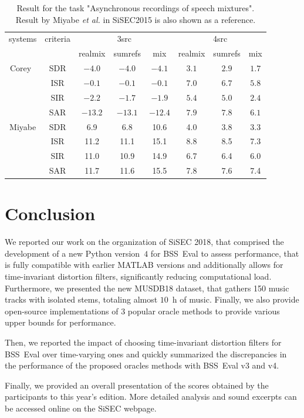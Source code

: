 \documentclass{llncs}
\begin{document}
\begin{table}
\centering
\caption{Result for the task "Asynchronous recordings of speech mixtures". Result by Miyabe {\it et al.} in SiSEC2015 is also shown as a reference.}
\label{table}
\begin{tabular}{|c|c|ccc|ccc|}\hline
systems&criteria&\multicolumn{3}{|c|}{3src}&\multicolumn{3}{|c|}{4src}\\
&&realmix&sumrefs&mix&realmix&sumrefs&mix\\\hline
Corey~\cite{corey}&SDR&$-4.0$&$-4.0$&$-4.1$&$3.1$&$2.9$&$1.7$\\
&ISR&$-0.1$&$-0.1$&$-0.1$&$7.0$&$6.7$&$5.8$\\
&SIR&$-2.2$&$-1.7$&$-1.9$&$5.4$&$5.0$&$2.4$\\
&SAR&$-13.2$&$-13.1$&$-12.4$&$7.9$&$7.8$&$6.1$\\\hline
Miyabe&SDR&6.9&6.8&10.6&4.0&3.8&3.3\\
&ISR&11.2&11.1&15.1&8.8&8.5&7.3\\
&SIR&11.0&10.9&14.9&6.7&6.4&6.0\\
&SAR&11.7&11.6&15.5&7.8&7.6&7.4\\\hline
\end{tabular}
\end{table}

\section{Conclusion}
\label{sec:concl}
\vspace{-2mm}
We reported our work on the organization of SiSEC 2018, that comprised the development of a new Python version~$4$ for BSS~Eval to assess performance, that is fully compatible with earlier MATLAB versions and additionally allows for time-invariant distortion filters, significantly reducing computational load. Furthermore, we presented the new MUSDB18 dataset, that gathers 150 music tracks with isolated stems, totaling almost $10$~h of music. Finally, we also provide open-source implementations of $3$ popular oracle methods to provide various upper bounds for performance.

Then, we reported the impact of choosing time-invariant distortion filters for BSS~Eval over time-varying ones and quickly summarized the discrepancies in the performance of the proposed oracles methods with BSS~Eval v3 and v4.

Finally, we provided an overall presentation of the scores obtained by the participants to this year's edition. More detailed analysis and sound excerpts can be accessed online on the SiSEC webpage.
\footnotesize


\end{document}
